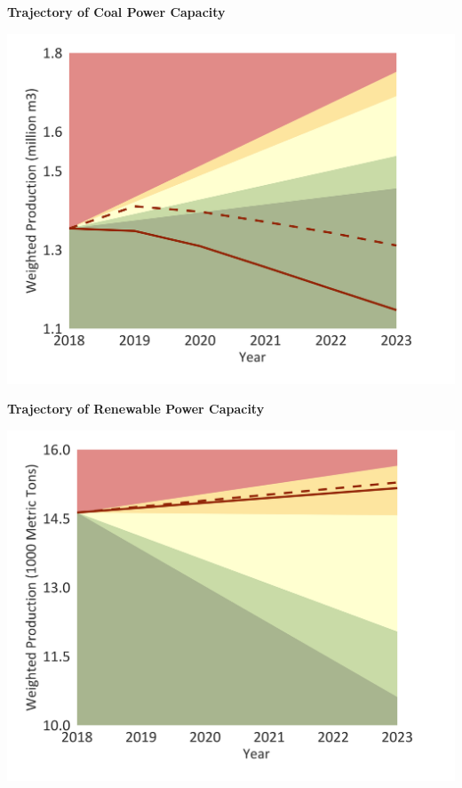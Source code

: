 \documentclass[10pt,table,a4]{article}\usepackage[]{graphicx}\usepackage[]{color}
\begin{document}
	\begin{minipage}[t]{.49\linewidth}
		\textbf{Trajectory of Coal Power Capacity }
		
		\includegraphics[trim = {0 0cm 0 0},width=1\linewidth]{CAFigures/Fig22}
		
		\textbf{Trajectory of Renewable Power Capacity }
		
		\includegraphics[trim = {0 0cm 0 0},width=.99\linewidth]{CAFigures/Fig23}
	\end{minipage}	
	\hspace{.02\linewidth}
\end{document}
